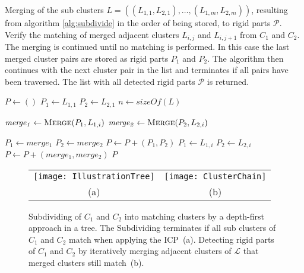 \begin{algorithm}[tbp]
	\caption{Merging of the sub clusters $\mathit{L} = ((L_{1,1}, L_{2,1}),\ldots,(L_{1,m}, L_{2,m}))$, resulting from algorithm \ref{alg:subdivide} in the order of being stored, to rigid parts $\mathcal{P}$. Verify the matching of merged adjacent clusters $L_{i,j}$ and $L_{i,j+1}$ from $C_1$ and $C_2$. The merging is continued until no matching is performed. In this case the last merged cluster pairs are stored as rigid parts $P_1$ and $P_2$. The algorithm then continues with the next cluster pair in the list and terminates if all pairs have been traversed. The list with all detected rigid parts $\mathcal{P}$ is returned.}
	\label{alg:merging}
	
	\begin{algorithmic}[1]     %
		\label{merging}
		
		\State $P \gets ()$
		\State $P_1 \gets L_{1,1}$
		\State $P_2 \gets L_{2,1}$
		\State $n \gets \mathit{sizeOf}(L)$
		
		\State $\mathit{merge_1} \gets \Call{Merge}{P_1, L_{1,i}}$
		\State $\mathit{merge_2} \gets \Call{Merge}{P_2, L_{2,i}}$
		
		\State $\mathit{P_1} \gets merge_1$
		\State $\mathit{P_2} \gets merge_2$
		\Else
		\State $P \gets P + (P_1, P_2)$
		\State $P_1 \gets L_{1,i}$
		\State $P_2 \gets L_{2,i}$
		\EndIf
		\EndFor
		\State $P \gets P + (merge_1, merge_2)$
		\State\Return $P$
		\EndProcedure	
	\end{algorithmic}
\end{algorithm}
\begin{figure}[H]
	\centering\small
	\begin{tabular}{cc}
		\texttt{[image: IllustrationTree]} &	
		\texttt{[image: ClusterChain]}
		\\
		(a) & (b) 
	\end{tabular}
	\caption{Subdividing of $C_1$ and $C_2$ into matching clusters by a depth-first approach in a tree. The Subdividing terminates if all sub clusters of $C_1$ and $C_2$ match when applying the ICP~(a). Detecting rigid parts of $C_1$ and $C_2$ by iteratively merging adjacent clusters of $\mathcal{L}$ that merged clusters still match~(b).} 
	\label{fig:clusterTree}
\end{figure}
